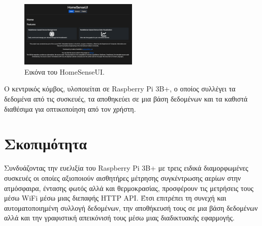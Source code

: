 \documentclass[conference]{IEEEtran}
\begin{document}
\begin{figure}[H]
	\centerline{\includegraphics[width=0.5\textwidth]{assets/index-html}}
	\caption{Εικόνα του HomeSenseUI.}
	\label{Εικόνα του HomeSenseUI.}
\end{figure}

Ο κεντρικός κόμβος, υλοποιείται σε Raspberry Pi 3B+, ο οποίος συλλέγει τα δεδομένα από τις συσκευές, τα αποθηκεύει σε μια βάση δεδομένων και τα καθιστά διαθέσιμα για οπτικοποίηση από τον χρήστη.

\section{Σκοπιμότητα}
Συνδυάζοντας την ευελιξία του Raspberry Pi 3B+ με τρεις ειδικά διαμορφωμένες συσκευές οι οποίες αξιοποιούν αισθητήρες μέτρησης συγκέντρωσης αερίων στην ατμόσφαιρα, έντασης φωτός αλλά και θερμοκρασίας, προσφέρουν τις μετρήσεις τους μέσω WiFi μέσω μιας διεπαφής HTTP API. Έτσι επιτρέπει τη συνεχή και αυτοματοποιημένη συλλογή δεδομένων, την αποθήκευσή τους σε μια βάση δεδομένων αλλά και την γραφιστική απεικόνισή τους μέσω μιας διαδικτυακής εφαρμογής.
\end{document}
